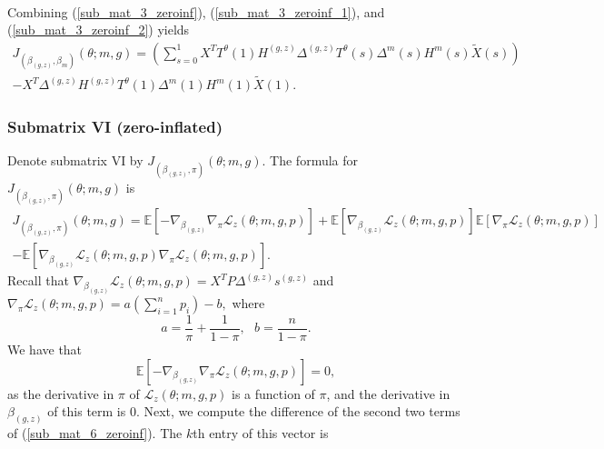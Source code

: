 \documentclass[12pt]{article}
\begin{document}
\begin{appendices}
\begin{refsection}
\begin{multline}
		\end{multline}
		Combining (\ref{sub_mat_3_zeroinf}), (\ref{sub_mat_3_zeroinf_1}), and (\ref{sub_mat_3_zeroinf_2}) yields
		\begin{multline}\label{sub_mat_4_zeroinf_formula} J_{(\beta_{(g,z)}, \beta_m)}(\theta; m, g) = \left(\sum_{s=0}^1 X^T  T^\theta(1) H^{(g,z)} \Delta^{(g,z)} T^\theta(s) \Delta^m(s) H^m(s) \tilde{X}(s) \right) \\ - X^T \Delta^{(g,z)} H^{(g,z)} T^\theta(1) \Delta^m(1)H^m(1) \tilde{X}(1).
		\end{multline}
		
		\subsubsection*{Submatrix VI (zero-inflated)}
		Denote submatrix VI by $J_{(\beta_{(g,z)},\pi)}(\theta; m, g).$ The formula for $J_{(\beta_{(g,z)},\pi)}(\theta; m, g)$ is
		\begin{multline}\label{sub_mat_6_zeroinf}
		J_{(\beta_{(g,z)},\pi)}(\theta; m, g) = \mathbb{E} \left[-\nabla_{\beta_{(g,z)}} \nabla_{\pi} \mathcal{L}_z(\theta; m, g, p) \right] + \mathbb{E}\left[ \nabla_{\beta_{(g,z)}}\mathcal{L}_z(\theta; m, g ,p)\right] \mathbb{E} \left[ \nabla_{\pi}\mathcal{L}_z(\theta; m,g,p) \right] \\ - \mathbb{E} \left[ \nabla_{\beta_{(g,z)}}\mathcal{L}_z(\theta; m,g,p) \nabla_{\pi}\mathcal{L}_z(\theta; m,g,p) \right].
		\end{multline} Recall that $\nabla_{\beta_{(g,z)}} \mathcal{L}_z(\theta; m, g, p) = X^T P \Delta^{(g,z)}s^{(g,z)}$ and $\nabla_\pi \mathcal{L}_z(\theta; m, g, p) = a \left(\sum_{i=1}^n p_i\right) - b,$ where $$a = \frac{1}{\pi} + \frac{1}{1 - \pi}, \textrm{    } b = \frac{n}{1 - \pi}.$$ 
		We have that
		\begin{equation}\label{sub_mat_6_zeroinf_1}
		\mathbb{E} \left[-\nabla_{\beta_{(g,z)}} \nabla_{\pi} \mathcal{L}_z(\theta; m, g, p) \right] = 0,
		\end{equation}
		as the derivative in $\pi$ of $\mathcal{L}_z(\theta; m, g, p)$ is a function of $\pi$, and the derivative in $\beta_{(g,z)}$ of this term is $0$. Next, we compute the difference of the second two terms of (\ref{sub_mat_6_zeroinf}). The $k$th entry of this vector is
		\begin{multline}\label{sub_mat_6_zeroinf_2}

\end{multline}
\end{refsection}
\end{appendices}
\end{document}
